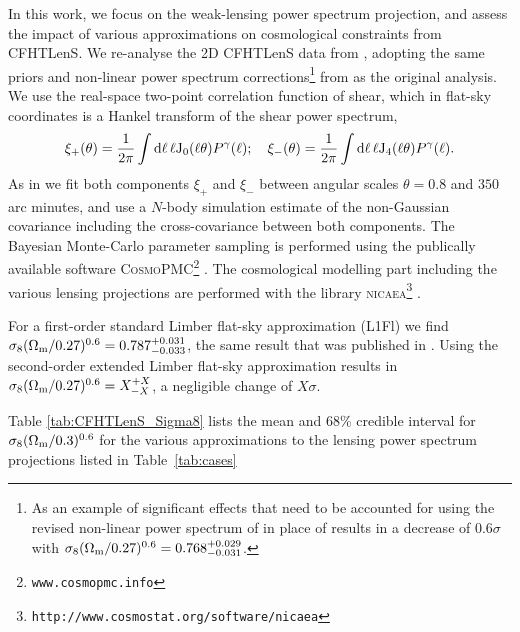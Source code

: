 In this work, we focus on the weak-lensing power spectrum projection, and
assess the impact of various approximations on cosmological constraints from
CFHTLenS. We re-analyse the 2D CFHTLenS data from \cite{CFHTLenS-2pt-notomo},
adopting the same priors and non-linear power spectrum corrections\footnote{As
an example of significant effects that need to be accounted for using the
revised non-linear power spectrum of \cite{2012ApJ...761..152T} in place of
\cite{2003MNRAS.341.1311S} results in a decrease of $0.6 \sigma$ with $\sigma_8
(\Omega_{\rm m}/0.27)^{0.6} =0.768^{+0.029}_{-0.031}$.} from
\cite{2003MNRAS.341.1311S} as the original \cite{CFHTLenS-2pt-notomo} analysis.
We use the real-space two-point correlation function of shear, which in flat-sky
coordinates is a Hankel transform of the shear power spectrum,
%
\begin{eqnarray}
  \xi_+(\theta) 
  = \frac 1 {2\pi} \int {\rm d} \ell \, \ell {\rm J}_0(\ell
   \theta)
  P^\gamma(\ell);
  \quad
   \xi_-(\theta)
  = \frac 1 {2\pi} \int
   {\rm d} \ell \, \ell {\rm J}_4(\ell \theta)
  P^\gamma(\ell).
   \label{eqn:xiGG}
\end{eqnarray}
%
As in \cite{CFHTLenS-2pt-notomo} we fit both components $\xi_+$ and $\xi_-$
between angular scales $\theta = 0.8$ and $350$ arc minutes, and use a $N$-body
simulation estimate of the non-Gaussian covariance including the
cross-covariance between both components. The Bayesian Monte-Carlo parameter
sampling is performed using the publically available software
\textsc{CosmoPMC}\footnote{\texttt{www.cosmopmc.info}} \citep{WK09,KWR10}. The
cosmological modelling part including the various lensing projections are
performed with the library
\textsc{nicaea}\footnote{\texttt{http://www.cosmostat.org/software/nicaea}}
\citep{KB09}. 

For a first-order standard Limber flat-sky approximation (L1Fl) we find
$\sigma_8 (\Omega_{\rm m}/0.27)^{0.6} =0.787^{+0.031}_{-0.033}$, the same
result that was published in \cite{CFHTLenS-2pt-notomo}. Using the second-order
extended Limber flat-sky approximation results in $\sigma_8 (\Omega_{\rm
m}/0.27)^{0.6} =X^{+X}_{-X}$, a negligible change of $X\sigma$. 

Table \ref{tab:CFHTLenS_Sigma8} lists the mean and 68\% credible interval for
$\sigma_8 (\Omega_{\rm m}/0.3)^{0.6}$ for the various approximations to the
lensing power spectrum projections listed in Table~\ref{tab:cases}

